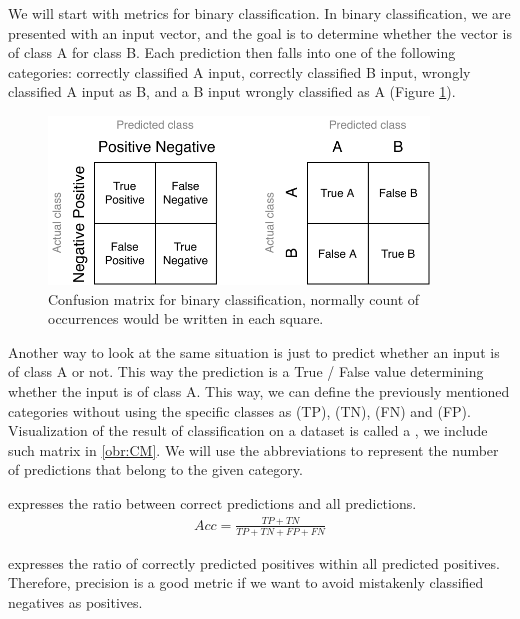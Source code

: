 We will start with metrics for binary classification. In binary classification, we are presented with an input vector, and the goal is to determine whether the vector is of class A for class B. Each prediction then falls into one of the following categories: correctly classified A input, correctly classified B input, wrongly classified A input as B, and a B input wrongly classified as A (Figure \ref{obr:CM}). 

\begin{figure}[h]\centering
\includegraphics[width=0.9\textwidth]{./img//Diplomka diagramy-Confusion matric}
\caption{Confusion matrix for binary classification, normally count of occurrences would be written in each square. }
\label{obr:CM}
\end{figure}

Another way to look at the same situation is just to predict whether an input is of class A or not. This way the prediction is a True / False value determining whether the input is of class A. This way, we can define the previously mentioned categories without using the specific classes as  (TP),  (TN),  (FN) and  (FP). Visualization of the result of classification on a dataset is called a , we include such matrix in \autoref{obr:CM}. We will use the abbreviations to represent the number of predictions that belong to the given category.  



 expresses the ratio between correct predictions and all predictions.
\begin{align}
Acc = \frac{TP+TN}{TP+TN+FP+FN}
\end{align} 



 expresses the ratio of correctly predicted positives within all predicted positives. Therefore, precision is a good metric if we want to avoid mistakenly classified negatives as positives.

